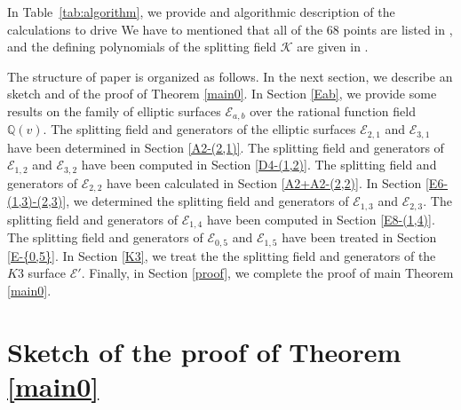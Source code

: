 \documentclass[11pt]{amsart}
\newcommand{\Q}{{\mathbb Q}}
\newcommand{\Ee}{{\mathcal E}}
\newcommand{\KK}{{\mathcal K}}
\numberwithin{equation}{section}
\numberwithin{table}{section}
\newcommand\<{\langle}
\begin{document}
In Table~\ref{tab:algorithm}, we provide and algorithmic description of the calculations to drive 
We have to mentioned that all of the 68 points are   listed in \cite[Points-68]{Shioda360-Codes}, and the defining polynomials of the splitting field $\KK$ are given in \cite[Pol-1728, Pol-11520]{Shioda360-Codes}.

The structure  of   paper is organized as follows. In the next section, we describe an   sketch and  of the proof  of Theorem \ref{main0}.
In Section \ref{Eab},  we provide some results on the family of elliptic surfaces $\Ee_{a,b}$ over the rational function field $\Q(v)$.
The splitting field and generators of the elliptic surfaces $\Ee_{2,1}$ and $\Ee_{3,1}$ have been determined in Section
\ref{A2-(2,1)}.  The splitting field and generators of  $\Ee_{1,2}$ and $\Ee_{3,2}$   have been computed in Section
\ref{D4-(1,2)}.  The splitting field and generators of $\Ee_{2,2}$ have been calculated in Section
\ref{A2+A2-(2,2)}. In Section \ref{E6-(1,3)-(2,3)}, we determined  the splitting field and generators of $\Ee_{1, 3}$  and $\Ee_{2, 3}$.
 The splitting field and generators of $\Ee_{1, 4}$  have been computed in Section
\ref{E8-(1,4)}.  The  splitting field and generators of  $\Ee_{0,5}$ and $\Ee_{1,5}$ have been treated in Section
\ref{E-{0,5}}. In Section \ref{K3}, we treat the the  splitting field and generators of the  $K3$ surface $\Ee'$.
 Finally, in Section \ref{proof}, we complete the proof of  main Theorem \ref{main0}.

\section{Sketch of the proof of  Theorem \ref{main0}}
\end{document}
